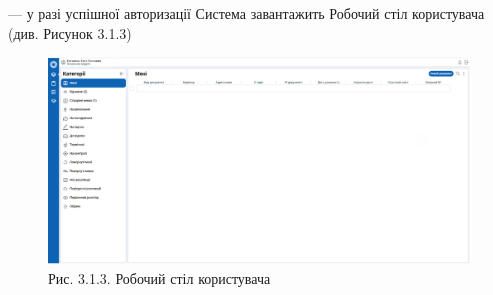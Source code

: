 --- у разі успішної авторизації Система завантажить Робочий стіл користувача (див. Рисунок 3.1.3)

\begin{figure}[!htbp]
\centerline{\includegraphics[width=\textwidth]{img/3.1.3.png}}
\caption{Рис. 3.1.3. Робочий стіл користувача}
\end{figure}

